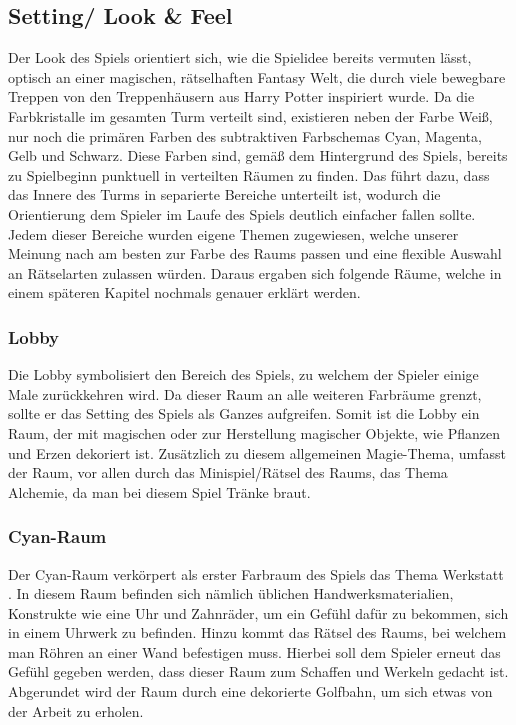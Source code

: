 \subsection{Setting/ Look \& Feel}
Der Look des Spiels orientiert sich, wie die Spielidee bereits vermuten lässt, optisch an einer magischen, rätselhaften Fantasy Welt, die durch viele bewegbare Treppen von den Treppenhäusern aus Harry Potter inspiriert wurde. Da die Farbkristalle im gesamten Turm verteilt sind, existieren neben der Farbe Weiß, nur noch die primären Farben des subtraktiven Farbschemas Cyan, Magenta, Gelb und Schwarz. Diese Farben sind, gemäß dem Hintergrund des Spiels, bereits zu Spielbeginn punktuell in verteilten Räumen zu finden. Das führt dazu, dass das Innere des Turms in separierte Bereiche unterteilt ist, wodurch die Orientierung dem Spieler im Laufe des Spiels deutlich einfacher fallen sollte. Jedem dieser Bereiche wurden eigene Themen zugewiesen, welche unserer Meinung nach am besten zur Farbe des Raums passen und eine flexible Auswahl an Rätselarten zulassen würden. Daraus ergaben sich folgende Räume, welche in einem späteren Kapitel nochmals genauer erklärt werden.
\newpage
\noindent
\subsubsection{Lobby}
Die Lobby symbolisiert den Bereich des Spiels, zu welchem der Spieler einige Male zurückkehren wird. Da dieser Raum an alle weiteren Farbräume grenzt, sollte er das Setting des Spiels als Ganzes aufgreifen. Somit ist die Lobby ein Raum, der mit magischen oder zur Herstellung magischer Objekte, wie Pflanzen und Erzen dekoriert ist. Zusätzlich zu diesem allgemeinen Magie-Thema, umfasst der Raum, vor allen durch das Minispiel/Rätsel des Raums, das Thema Alchemie, da man bei diesem Spiel Tränke braut.
\subsubsection{Cyan-Raum}
Der Cyan-Raum verkörpert als erster Farbraum des Spiels das Thema \dq Werkstatt \dq. In diesem Raum befinden sich nämlich üblichen Handwerksmaterialien, Konstrukte wie eine Uhr und Zahnräder, um ein Gefühl dafür zu bekommen, sich in einem Uhrwerk zu befinden. Hinzu kommt das Rätsel des Raums, bei welchem man Röhren an einer Wand befestigen muss. Hierbei soll dem Spieler erneut das Gefühl gegeben werden, dass dieser Raum zum Schaffen und Werkeln gedacht ist. Abgerundet wird der Raum durch eine dekorierte Golfbahn, um sich etwas von der Arbeit zu erholen.
